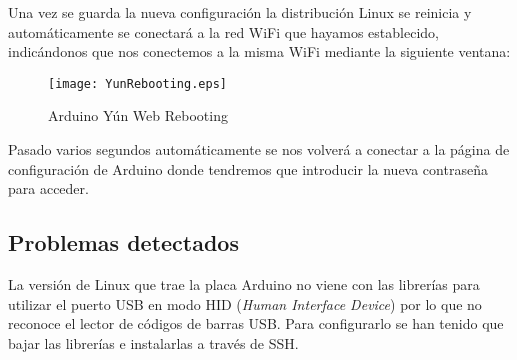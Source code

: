 Una vez se guarda la nueva configuración la distribución Linux se reinicia y automáticamente se conectará a la red WiFi que hayamos establecido, indicándonos que nos conectemos a la misma WiFi mediante la siguiente ventana:

\begin{figure}[H]
    \centering
    \texttt{[image: YunRebooting.eps]}
    \caption{Arduino Yún Web Rebooting}\label{fig:yun-web-rebooting}
\end{figure}

Pasado varios segundos automáticamente se nos volverá a conectar a la página de configuración de Arduino donde tendremos que introducir la nueva contraseña para acceder.

\subsection{Problemas detectados}

La versión de Linux que trae la placa Arduino no viene con las librerías para utilizar el puerto USB en modo HID (\emph{Human Interface Device}) por lo que no reconoce el lector de códigos de barras USB. Para configurarlo se han tenido que bajar las librerías e instalarlas a través de SSH.

